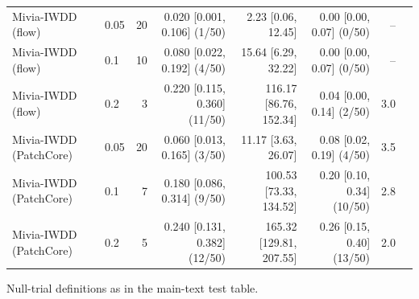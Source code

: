 \begin{table}[t]
{\begin{tabular}{llrrrrrr}
Mivia-IWDD (flow) & 0.05 & 20 & 0.020 [0.001, 0.106] (1/50) & 2.23 [0.06, 12.45] & 0.00 [0.00, 0.07] (0/50) & -- \\
Mivia-IWDD (flow) & 0.1 & 10 & 0.080 [0.022, 0.192] (4/50) & 15.64 [6.29, 32.22] & 0.00 [0.00, 0.07] (0/50) & -- \\
Mivia-IWDD (flow) & 0.2 & 3 & 0.220 [0.115, 0.360] (11/50) & 116.17 [86.76, 152.34] & 0.04 [0.00, 0.14] (2/50) & 3.0 \\
Mivia-IWDD (PatchCore) & 0.05 & 20 & 0.060 [0.013, 0.165] (3/50) & 11.17 [3.63, 26.07] & 0.08 [0.02, 0.19] (4/50) & 3.5 \\
Mivia-IWDD (PatchCore) & 0.1 & 7 & 0.180 [0.086, 0.314] (9/50) & 100.53 [73.33, 134.52] & 0.20 [0.10, 0.34] (10/50) & 2.8 \\
Mivia-IWDD (PatchCore) & 0.2 & 5 & 0.240 [0.131, 0.382] (12/50) & 165.32 [129.81, 207.55] & 0.26 [0.15, 0.40] (13/50) & 2.0 \\
\bottomrule
\end{tabular}}
\begin{minipage}{\linewidth}\vspace{2pt}\footnotesize Null-trial definitions as in the main-text test table.\end{minipage}
\end{table}
